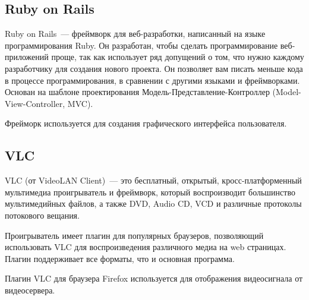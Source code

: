 \subsection{Ruby on Rails}
Ruby on Rails~--- фреймворк для веб-разработки, написанный на языке программирования Ruby.
Он разработан, чтобы сделать программирование веб-приложений проще, так как использует ряд допущений
о том, что нужно каждому разработчику для создания нового проекта. Он позволяет вам писать меньше
кода в процессе программирования, в сравнении с другими языками и фреймворками. Основан на
шаблоне проектирования Модель-Представление-Контроллер (Model-View-Controller, MVC).

Фрейморк используется для создания графического интерфейса пользователя.

\subsection{VLC}
VLC (от VideoLAN Client)~--- это бесплатный, открытый, кросс-платформенный мультимедиа
проигрыватель и фреймворк, который воспроизводит большинство мультимедийных файлов,
а также DVD, Audio CD, VCD и различные протоколы потокового вещания.

Проигрыватель имеет плагин для популярных браузеров, позволяющий использовать VLC для воспроизведения
различного медиа на web страницах. Плагин поддерживает все форматы, что и основная программа.

Плагин VLC для браузера Firefox используется для отображения видеосигнала от видеосервера.
